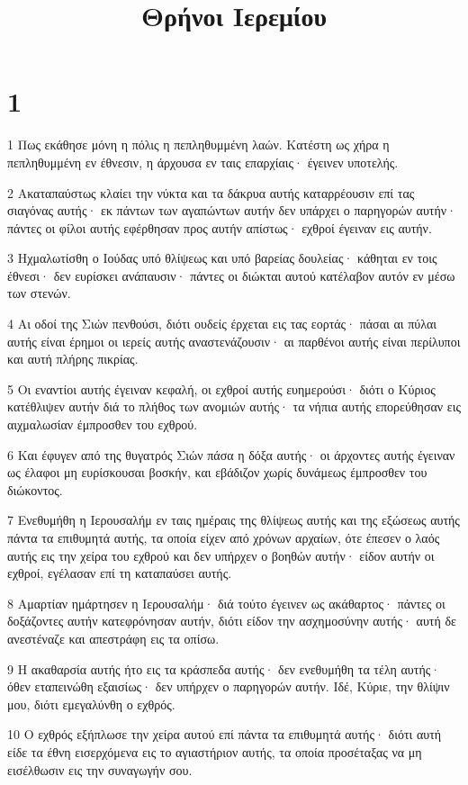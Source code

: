 

\title{Θρήνοι Ιερεμίου}


\chapter{1}

\par 1 Πως εκάθησε μόνη η πόλις η πεπληθυμμένη λαών. Κατέστη ως χήρα η πεπληθυμμένη εν έθνεσιν, η άρχουσα εν ταις επαρχίαις· έγεινεν υποτελής.
\par 2 Ακαταπαύστως κλαίει την νύκτα και τα δάκρυα αυτής καταρρέουσιν επί τας σιαγόνας αυτής· εκ πάντων των αγαπώντων αυτήν δεν υπάρχει ο παρηγορών αυτήν· πάντες οι φίλοι αυτής εφέρθησαν προς αυτήν απίστως· εχθροί έγειναν εις αυτήν.
\par 3 Ηχμαλωτίσθη ο Ιούδας υπό θλίψεως και υπό βαρείας δουλείας· κάθηται εν τοις έθνεσι· δεν ευρίσκει ανάπαυσιν· πάντες οι διώκται αυτού κατέλαβον αυτόν εν μέσω των στενών.
\par 4 Αι οδοί της Σιών πενθούσι, διότι ουδείς έρχεται εις τας εορτάς· πάσαι αι πύλαι αυτής είναι έρημοι οι ιερείς αυτής αναστενάζουσιν· αι παρθένοι αυτής είναι περίλυποι και αυτή πλήρης πικρίας.
\par 5 Οι εναντίοι αυτής έγειναν κεφαλή, οι εχθροί αυτής ευημερούσι· διότι ο Κύριος κατέθλιψεν αυτήν διά το πλήθος των ανομιών αυτής· τα νήπια αυτής επορεύθησαν εις αιχμαλωσίαν έμπροσθεν του εχθρού.
\par 6 Και έφυγεν από της θυγατρός Σιών πάσα η δόξα αυτής· οι άρχοντες αυτής έγειναν ως έλαφοι μη ευρίσκουσαι βοσκήν, και εβάδιζον χωρίς δυνάμεως έμπροσθεν του διώκοντος.
\par 7 Ενεθυμήθη η Ιερουσαλήμ εν ταις ημέραις της θλίψεως αυτής και της εξώσεως αυτής πάντα τα επιθυμητά αυτής, τα οποία είχεν από χρόνων αρχαίων, ότε έπεσεν ο λαός αυτής εις την χείρα του εχθρού και δεν υπήρχεν ο βοηθών αυτήν· είδον αυτήν οι εχθροί, εγέλασαν επί τη καταπαύσει αυτής.
\par 8 Αμαρτίαν ημάρτησεν η Ιερουσαλήμ· διά τούτο έγεινεν ως ακάθαρτος· πάντες οι δοξάζοντες αυτήν κατεφρόνησαν αυτήν, διότι είδον την ασχημοσύνην αυτής· αυτή δε ανεστέναζε και απεστράφη εις τα οπίσω.
\par 9 Η ακαθαρσία αυτής ήτο εις τα κράσπεδα αυτής· δεν ενεθυμήθη τα τέλη αυτής· όθεν εταπεινώθη εξαισίως· δεν υπήρχεν ο παρηγορών αυτήν. Ιδέ, Κύριε, την θλίψιν μου, διότι εμεγαλύνθη ο εχθρός.
\par 10 Ο εχθρός εξήπλωσε την χείρα αυτού επί πάντα τα επιθυμητά αυτής· διότι αυτή είδε τα έθνη εισερχόμενα εις το αγιαστήριον αυτής, τα οποία προσέταξας να μη εισέλθωσιν εις την συναγωγήν σου.
